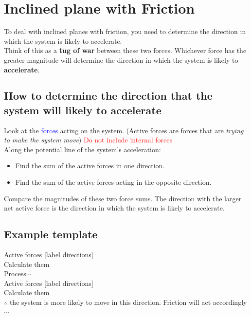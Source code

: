 \section{Inclined plane with Friction}
To deal with inclined planes with friction, you need to determine the direction in which the system is likely to accelerate. 
\\

Think of this as a \textbf{tug of war} between these two forces. Whichever force has the greater magnitude will determine the direction in which the system is 
likely to \textbf{accelerate}.

\subsection{How to determine the direction that the system will likely to accelerate}
Look at the \textcolor{blue}{forces} acting on the system. (Active forces are forces that are \textit{trying to make the system move})
\textcolor{red}{Do not include internal forces} \\

Along the potential line of the system's acceleration:
\begin{itemize}
    \item Find the sum of the active forces in one direction.
    \item Find the sum of the active forces acting in the opposite direction.
\end{itemize}
Compare the magnitudes of these two force sums. The direction with the larger net active force is the direction in which the 
system is likely to accelerate.

\subsection{Example template}
\begin{center}
    Active forces [label directions]\\
    Calculate them\\
    Process$\cdots$\\
    Active forces [label directions]\\
    Calculate them\\
    $\therefore$ the system is more likely to move in this direction. Friction will act accordingly $\cdots$
\end{center}
